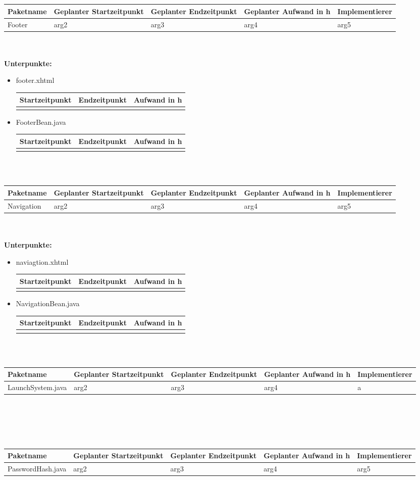 \documentclass[12pt,a4paper]{scrreprt}
\newcommand{\Arbeitspaket}[5]{	\begin{tabular}{|p{4cm}|p{3cm}|p{3cm}|p{3cm}|p{3cm}|}
		\hline \textbf{Paketname} & \textbf{Geplanter Startzeitpunkt} & \textbf{Geplanter Endzeitpunkt} & \textbf{Geplanter Aufwand in h} & \textbf{Implementierer} \\ 
		\hline #1 & #2  & #3 & #4 & #5 \\ 
		\hline 
	\end{tabular} \ \\
	\ \\}
\begin{document}
	\ \\
	\ \\
	\Arbeitspaket{Footer}{arg2}{arg3}{arg4}{arg5}
	\textbf{Unterpunkte:}
	\begin{itemize}
		\item footer.xhtml\\
		\begin{tabular}{|p{4cm}|p{4cm}|p{4cm}|}
			\hline Startzeitpunkt & Endzeitpunkt & Aufwand in h \\ 
			\hline &      &  \\ 
			\hline 
		\end{tabular}
		\item FooterBean.java\\
		\begin{tabular}{|p{4cm}|p{4cm}|p{4cm}|}
			\hline Startzeitpunkt & Endzeitpunkt & Aufwand in h \\ 
			\hline &      &  \\ 
			\hline 
		\end{tabular}
	\end{itemize}
	
	\ \\
	\ \\
	\Arbeitspaket{Navigation}{arg2}{arg3}{arg4}{arg5}
	\textbf{Unterpunkte:}
	\begin{itemize}
		\item naviagtion.xhtml\\
		\begin{tabular}{|p{4cm}|p{4cm}|p{4cm}|}
			\hline Startzeitpunkt & Endzeitpunkt & Aufwand in h \\ 
			\hline &      &  \\ 
			\hline 
		\end{tabular}
		\item NavigationBean.java\\
		\begin{tabular}{|p{4cm}|p{4cm}|p{4cm}|}
			\hline Startzeitpunkt & Endzeitpunkt & Aufwand in h \\ 
			\hline &      &  \\ 
			\hline 
		\end{tabular}
	\end{itemize}
	
	
	\ \\
	\ \\
	\Arbeitspaket{LaunchSystem.java}{arg2}{arg3}{arg4}{a}


	\ \\
	\ \\
	\Arbeitspaket{PasswordHash.java}{arg2}{arg3}{arg4}{arg5}
	
\end{document}
